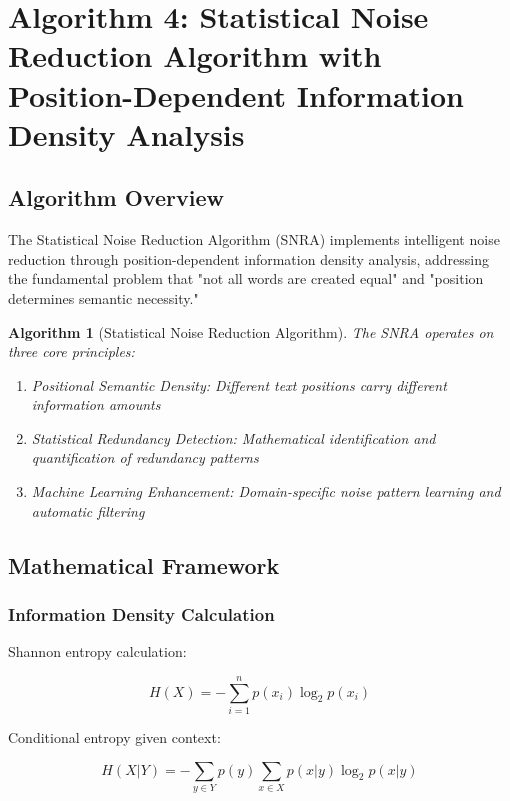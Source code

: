 \documentclass[12pt,a4paper]{article}
\newtheorem{algorithm_def}[theorem]{Algorithm}
\begin{document}
\section{Algorithm 4: Statistical Noise Reduction Algorithm with Position-Dependent Information Density Analysis}

\subsection{Algorithm Overview}

The Statistical Noise Reduction Algorithm (SNRA) implements intelligent noise reduction through position-dependent information density analysis, addressing the fundamental problem that "not all words are created equal" and "position determines semantic necessity."

\begin{algorithm_def}[Statistical Noise Reduction Algorithm]
\label{alg:snra}
The SNRA operates on three core principles:
\begin{enumerate}
    \item Positional Semantic Density: Different text positions carry different information amounts
    \item Statistical Redundancy Detection: Mathematical identification and quantification of redundancy patterns
    \item Machine Learning Enhancement: Domain-specific noise pattern learning and automatic filtering
\end{enumerate}
\end{algorithm_def}

\subsection{Mathematical Framework}

\subsubsection{Information Density Calculation}

Shannon entropy calculation:

\begin{equation}
H(X) = -\sum_{i=1}^{n} p(x_i) \log_2 p(x_i)
\end{equation}

Conditional entropy given context:

\begin{equation}
H(X|Y) = -\sum_{y \in Y} p(y) \sum_{x \in X} p(x|y) \log_2 p(x|y)
\end{equation}
\end{document}
